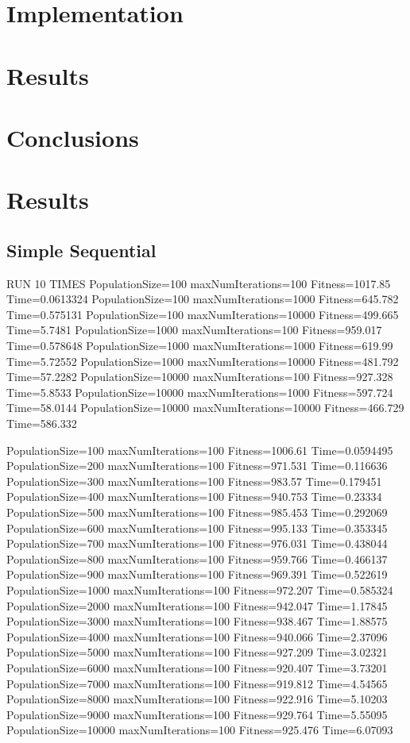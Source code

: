 \documentclass[10pt,letterpaper]{article}
\begin{document}
\section{Implementation}

\section{Results}

\section{Conclusions}




\section{Results}
\subsection{Simple Sequential} 
RUN 10 TIMES 
PopulationSize=100 maxNumIterations=100 Fitness=1017.85 Time=0.0613324
PopulationSize=100 maxNumIterations=1000 Fitness=645.782 Time=0.575131
PopulationSize=100 maxNumIterations=10000 Fitness=499.665 Time=5.7481
PopulationSize=1000 maxNumIterations=100 Fitness=959.017 Time=0.578648
PopulationSize=1000 maxNumIterations=1000 Fitness=619.99 Time=5.72552
PopulationSize=1000 maxNumIterations=10000 Fitness=481.792 Time=57.2282
PopulationSize=10000 maxNumIterations=100 Fitness=927.328 Time=5.8533
PopulationSize=10000 maxNumIterations=1000 Fitness=597.724 Time=58.0144
PopulationSize=10000 maxNumIterations=10000 Fitness=466.729 Time=586.332


PopulationSize=100 maxNumIterations=100 Fitness=1006.61 Time=0.0594495
PopulationSize=200 maxNumIterations=100 Fitness=971.531 Time=0.116636
PopulationSize=300 maxNumIterations=100 Fitness=983.57 Time=0.179451
PopulationSize=400 maxNumIterations=100 Fitness=940.753 Time=0.23334
PopulationSize=500 maxNumIterations=100 Fitness=985.453 Time=0.292069
PopulationSize=600 maxNumIterations=100 Fitness=995.133 Time=0.353345
PopulationSize=700 maxNumIterations=100 Fitness=976.031 Time=0.438044
PopulationSize=800 maxNumIterations=100 Fitness=959.766 Time=0.466137
PopulationSize=900 maxNumIterations=100 Fitness=969.391 Time=0.522619
PopulationSize=1000 maxNumIterations=100 Fitness=972.207 Time=0.585324
PopulationSize=2000 maxNumIterations=100 Fitness=942.047 Time=1.17845
PopulationSize=3000 maxNumIterations=100 Fitness=938.467 Time=1.88575
PopulationSize=4000 maxNumIterations=100 Fitness=940.066 Time=2.37096
PopulationSize=5000 maxNumIterations=100 Fitness=927.209 Time=3.02321
PopulationSize=6000 maxNumIterations=100 Fitness=920.407 Time=3.73201
PopulationSize=7000 maxNumIterations=100 Fitness=919.812 Time=4.54565
PopulationSize=8000 maxNumIterations=100 Fitness=922.916 Time=5.10203
PopulationSize=9000 maxNumIterations=100 Fitness=929.764 Time=5.55095
PopulationSize=10000 maxNumIterations=100 Fitness=925.476 Time=6.07093
\end{document}

